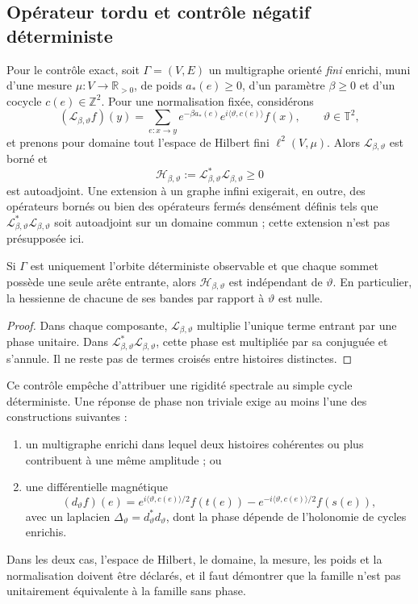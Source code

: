 \subsection{Opérateur tordu et contrôle négatif déterministe}

Pour le contrôle exact, soit \(\Gamma=(V,E)\) un multigraphe orienté
\emph{fini} enrichi, muni d'une mesure
\(\mu:V\to\mathbb R_{>0}\), de poids \(a_\ast(e)\geq0\), d'un paramètre
\(\beta\geq0\) et d'un cocycle
\(c(e)\in\mathbb Z^2\). Pour une normalisation fixée, considérons
\[
 (\mathcal L_{\beta,\vartheta}f)(y)
 =
 \sum_{e:x\to y}
 e^{-\beta a_\ast(e)}
 e^{i\langle\vartheta,c(e)\rangle}f(x),
 \qquad
 \vartheta\in\mathbb T^2,
\]
et prenons pour domaine tout l'espace de Hilbert fini
\(\ell^2(V,\mu)\). Alors \(\mathcal L_{\beta,\vartheta}\) est borné et
\[
 \mathcal H_{\beta,\vartheta}
 :=\mathcal L_{\beta,\vartheta}^{*}
   \mathcal L_{\beta,\vartheta}\geq0
\]
est autoadjoint. Une extension à un graphe infini exigerait, en outre,
des opérateurs bornés ou bien des opérateurs fermés densément définis tels
que \(\mathcal L_{\beta,\vartheta}^{*}
\mathcal L_{\beta,\vartheta}\) soit autoadjoint sur un domaine commun ;
cette extension n'est pas présupposée ici.

\begin{proposition}
\label{prop:control-negativo-espectral-determinista}
Si \(\Gamma\) est uniquement l'orbite déterministe observable et que chaque sommet
possède une seule arête entrante, alors
\(\mathcal H_{\beta,\vartheta}\) est indépendant de \(\vartheta\). En
particulier, la hessienne de chacune de ses bandes par rapport à
\(\vartheta\) est nulle.
\end{proposition}

\begin{proof}
Dans chaque composante, \(\mathcal L_{\beta,\vartheta}\) multiplie l'unique
terme entrant par une phase unitaire. Dans
\(\mathcal L_{\beta,\vartheta}^{*}\mathcal L_{\beta,\vartheta}\), cette phase
est multipliée par sa conjuguée et s'annule. Il ne reste pas de termes croisés
entre histoires distinctes.
\end{proof}

Ce contrôle empêche d'attribuer une rigidité spectrale au simple cycle déterministe.
Une réponse de phase non triviale exige au moins l'une des constructions
suivantes :
\begin{enumerate}
 \item un multigraphe enrichi dans lequel deux histoires cohérentes ou plus
 contribuent à une même amplitude ; ou
 \item une différentielle magnétique
 \[
  (d_\vartheta f)(e)
  =
  e^{i\langle\vartheta,c(e)\rangle/2}f(t(e))
  -
  e^{-i\langle\vartheta,c(e)\rangle/2}f(s(e)),
 \]
 avec un laplacien
 \(\Delta_\vartheta=d_\vartheta^*d_\vartheta\), dont la phase dépende de
 l'holonomie de cycles enrichis.
\end{enumerate}
Dans les deux cas, l'espace de Hilbert, le domaine, la mesure,
les poids et la normalisation doivent être déclarés, et il faut démontrer que la famille n'est pas
unitairement équivalente à la famille sans phase.

